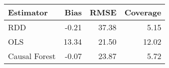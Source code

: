 \begin{table}[ht]
\centering
\begin{tabular}{lrrr}
  \hline
Estimator & Bias & RMSE & Coverage \\ 
  \hline
RDD & -0.21 & 37.38 & 5.15 \\ 
  OLS & 13.34 & 21.50 & 12.02 \\ 
  Causal Forest & -0.07 & 23.87 & 5.72 \\ 
   \hline
\end{tabular}
\caption{} 
\end{table}

